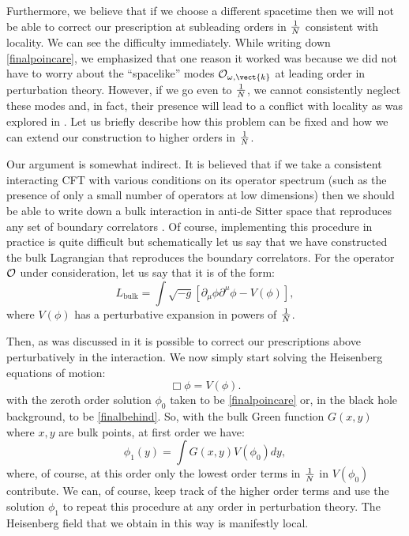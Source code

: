 Furthermore, we believe that if we choose a different spacetime then we will not be able to correct our prescription at subleading orders in ${1 \over N}$ consistent with locality. We can see the difficulty immediately. While writing down \eqref{finalpoincare}, we emphasized that one reason it worked was because we did not have to worry about the ``spacelike'' modes ${\cal O}_{\omega,\vect{k}}$ at leading order in perturbation theory. However, if we go even to ${1 \over N}$, we cannot consistently neglect these modes and, in fact, their presence will lead to a conflict with locality as was explored in \cite{Kabat:2011rz}. Let us briefly describe how this problem can be fixed and how we can extend our construction to higher orders in ${1 \over N}$. 

Our argument is somewhat indirect. It is believed that if we take a consistent interacting CFT with various conditions on its operator spectrum (such as the presence of only a small number of operators at low dimensions) then we should be able to write down a bulk interaction in anti-de Sitter space that reproduces any set of boundary correlators \cite{Heemskerk:2009pn, Heemskerk:2010ty,
Fitzpatrick:2010zm,Fitzpatrick:2012cg,ElShowk:2011ag}. Of course, implementing this procedure in practice is quite difficult but schematically let us say that we have constructed the bulk Lagrangian that reproduces the boundary correlators. For the operator ${\cal O}$ under consideration, let us say that it is of the form:
\[
L_{\text{bulk}} = \int \sqrt{-g} \left[\partial_{\mu} \phi \partial^{\mu} \phi - V(\phi) \right],
 \]
where $V(\phi)$ has a perturbative expansion in powers of ${1 \over N}$. 

Then, as was discussed in \cite{Kabat:2011rz,Kabat:2012hp,Heemskerk:2012mn} it is possible to correct our prescriptions above perturbatively in the interaction. We now simply start solving the Heisenberg equations of motion:
\[
\Box \phi = V(\phi).
 \]
with the zeroth order solution $\phi_0$ taken to be \eqref{finalpoincare} or, in the black hole background, to be \eqref{finalbehind}. 
So, with the bulk Green function $G(x,y)$ where $x,y$ are bulk points, at first order we have:
\[
\phi_1(y) = \int G(x,y) V(\phi_0) d y,
 \]
where, of course, at this order only the lowest order terms in ${1 \over N}$ in $V(\phi_0)$ contribute. We can, of course, keep track of the higher order terms
and use the solution $\phi_1$ to repeat this procedure at any order in perturbation theory. The Heisenberg field that we obtain in this way is manifestly local. 


